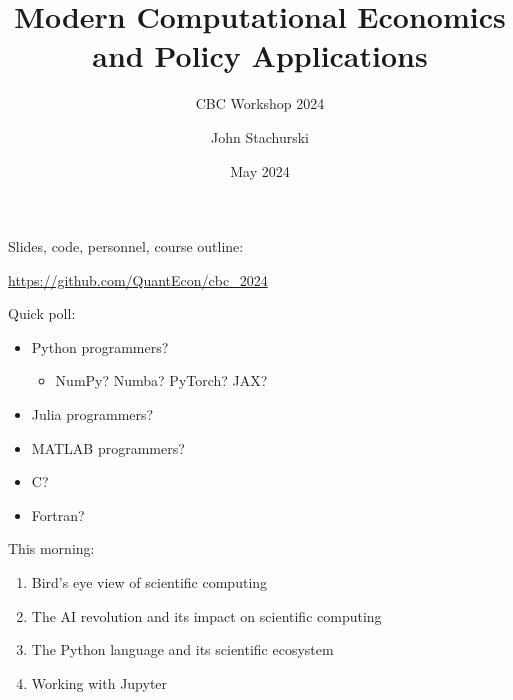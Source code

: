 \documentclass[
    xcolor={svgnames,dvipsnames},
    hyperref={colorlinks, citecolor=DeepPink4, linkcolor=DarkRed, urlcolor=DarkBlue}
    ]{beamer}  %
\title{Modern Computational Economics \\ and Policy Applications}
\subtitle{CBC Workshop 2024}
\author{John Stachurski}
\date{May 2024}
\newcommand{\1}{\mathbbm 1}
\begin{document}
\begin{frame}
  \titlepage
\end{frame}




\begin{frame}
    
    Slides, code, personnel, course outline:

    \vspace{0.5em}
    \vspace{0.5em}
    \vspace{0.5em}
    \begin{center}
    \url{https://github.com/QuantEcon/cbc_2024}
    \end{center}

\end{frame}

\begin{frame}
    
    Quick poll:

    \begin{itemize}
        \item Python programmers?
    \vspace{0.5em}
            \begin{itemize}
                \item NumPy?  Numba?  PyTorch? JAX?
            \end{itemize}
    \vspace{0.5em}
        \item Julia programmers?
    \vspace{0.5em}
        \item MATLAB programmers?
    \vspace{0.5em}
        \item C?
    \vspace{0.5em}
        \item Fortran?
    \end{itemize}
    
\end{frame}

\begin{frame}
    
    This morning:

    \begin{enumerate}
        \item Bird's eye view of scientific computing
        \vspace{0.5em}
        \item The AI revolution and its impact on scientific computing
        \vspace{0.5em}
        \item The Python language and its scientific ecosystem
        \vspace{0.5em}
        \item Working with Jupyter
    \end{enumerate}

\end{frame}
\end{document}
